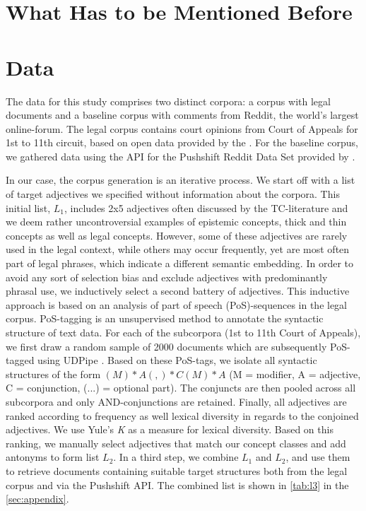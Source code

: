 \documentclass{article}
\begin{document}
\section{What Has to be Mentioned Before}
\label{sec:before}

\section{Data}

The data for this study comprises two distinct corpora: a corpus with legal documents and a baseline corpus with comments from Reddit, the world's largest online-forum. The legal corpus contains court opinions from Court of Appeals for 1st to 11th circuit, based on open data provided by the \citet{FreeLawProject2020}. For the baseline corpus, we gathered data using the API for the Pushshift Reddit Data Set provided by \citet{Baumgartner2020}. 

In our case, the corpus generation is an iterative process. We start off with a list of target adjectives we specified without information about the corpora. This initial list, $L_1$, includes 2x5 adjectives often discussed by the TC-literature and we deem rather uncontroversial examples of epistemic concepts, thick and thin concepts as well as legal concepts. However, some of these adjectives are rarely used in the legal context, while others may occur frequently, yet are most often part of legal phrases, which indicate a different semantic embedding. In order to avoid any sort of selection bias and exclude adjectives with predominantly phrasal use, we inductively select a second battery of adjectives. This inductive approach is based on an analysis of part of speech (PoS)-sequences in the legal corpus. PoS-tagging is an unsupervised method to annotate the syntactic structure of text data. For each of the subcorpora (1st to 11th Court of Appeals), we first draw a random sample of 2000 documents which are subsequently PoS-tagged using UDPipe \citep{Straka2017, Straka2020}. Based on these PoS-tags, we isolate all syntactic structures of the form $(M)*A(,)*C(M)*A$ (M = modifier, A = adjective, C = conjunction, (...) = optional part). The conjuncts are then pooled across all subcorpora and only AND-conjunctions are retained. Finally, all adjectives %
are ranked according to frequency as well lexical diversity in regards to the conjoined adjectives. We use Yule's \textit{K} \citep{Yule1944, Tweedie1998} as a measure for lexical diversity.  %
Based on this ranking, we manually select adjectives that match our concept classes and add antonyms to form list $L_2$. In a third step, we combine $L_1$ and $L_2$, and use them to retrieve documents containing suitable target structures both from the legal corpus and via the Pushshift API. The combined list is shown in \ref{tab:l3} in the \ref{sec:appendix}. 
\end{document}
